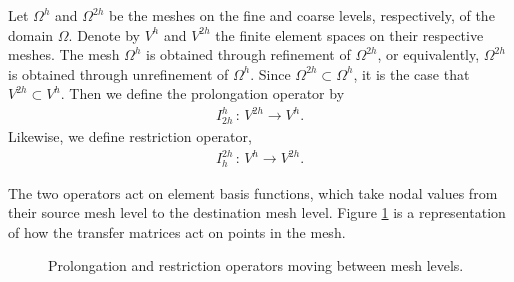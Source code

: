 Let $\Omega^h$ and $\Omega^{2h}$ be the meshes on the fine and coarse levels, respectively, of the domain $\Omega$.
Denote by $V^{h}$ and $V^{2h}$ the finite element spaces on their respective meshes.
The mesh $\Omega^{h}$ is obtained through refinement of $\Omega^{2h}$, or equivalently, $\Omega^{2h}$ is obtained through unrefinement of $\Omega^{h}$.
Since $\Omega^{2h}\subset \Omega^{h}$, it is the case that $V^{2h}\subset V^h$.
Then we define the prolongation operator by
\begin{align}
	I^h_{2h} \, : \, V^{2h} \rightarrow V^h.
\end{align}
Likewise, we define restriction operator,
\begin{align}
	I^{2h}_h \, : \, V^{h} \rightarrow V^{2h}.
\end{align}

The two operators act on element basis functions, which take nodal values from their source mesh level to the destination mesh level.
Figure \ref{fig:pro_res_ops} is a representation of how the transfer matrices act on points in the mesh.

\begin{figure}[h]
	\centering
	
	\caption{\label{fig:pro_res_ops} Prolongation and restriction operators moving between mesh levels.}
\end{figure}

